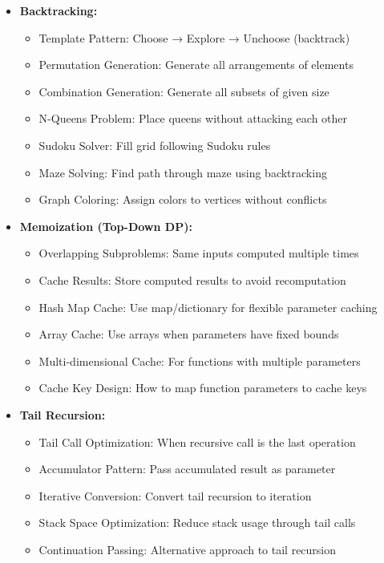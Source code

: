 \documentclass[a4paper,10pt]{book}
\begin{document}
\begin{itemize}[leftmargin=*]
    \item \textbf{Backtracking:}
    \begin{itemize}
        \item Template Pattern: Choose → Explore → Unchoose (backtrack)
        \item Permutation Generation: Generate all arrangements of elements
        \item Combination Generation: Generate all subsets of given size
        \item N-Queens Problem: Place queens without attacking each other
        \item Sudoku Solver: Fill grid following Sudoku rules
        \item Maze Solving: Find path through maze using backtracking
        \item Graph Coloring: Assign colors to vertices without conflicts
    \end{itemize}

    \item \textbf{Memoization (Top-Down DP):}
    \begin{itemize}
        \item Overlapping Subproblems: Same inputs computed multiple times
        \item Cache Results: Store computed results to avoid recomputation
        \item Hash Map Cache: Use map/dictionary for flexible parameter caching
        \item Array Cache: Use arrays when parameters have fixed bounds
        \item Multi-dimensional Cache: For functions with multiple parameters
        \item Cache Key Design: How to map function parameters to cache keys
    \end{itemize}

    \item \textbf{Tail Recursion:}
    \begin{itemize}
        \item Tail Call Optimization: When recursive call is the last operation
        \item Accumulator Pattern: Pass accumulated result as parameter
        \item Iterative Conversion: Convert tail recursion to iteration
        \item Stack Space Optimization: Reduce stack usage through tail calls
        \item Continuation Passing: Alternative approach to tail recursion
    \end{itemize}
\end{itemize}
\end{document}
